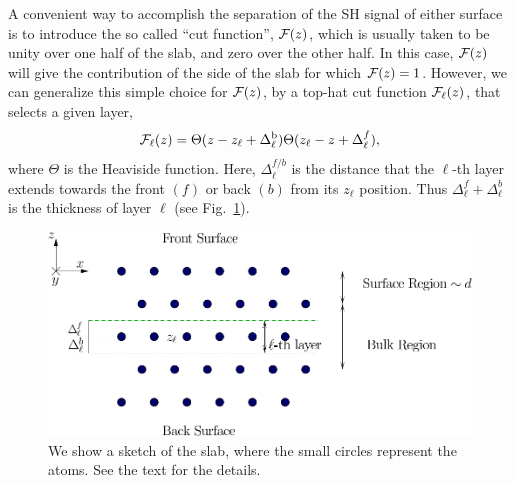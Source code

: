 \documentclass[floatfix,prb,aps,superscriptaddress,11pt,preprint]{revtex4}
\begin{document}
A convenient way to accomplish the separation of the SH signal of
either surface is to introduce
the so called
``cut function'', ${\mathbf{\cal F}}(z)$, which is usually taken to be unity over one half
of the slab, and zero over the other half.
In this case, ${\mathbf{\cal F}}(z)$ will give the contribution of the side of the
slab for which ${\mathbf{\cal F}}(z)=1$. However, we can generalize this simple choice
for ${\mathbf{\cal F}}(z)$, 
by a top-hat cut function
${\mathbf{\cal F}}_\ell(z)$, that selects a given layer,
\begin{equation}
\label{sz}
{\mathbf{\cal F}}_\ell(z)=\Theta(z-z_\ell+\Delta_\ell^{\mathrm{b}})
            \Theta(z_\ell-z+\Delta_\ell^f),
\end{equation}
where $\Theta$ is the Heaviside function. Here, $\Delta_\ell^{f/b}$
is the distance that the $\ell$-th layer extends towards the front
$(f)$ or back $(b)$ from its $z_\ell$ position.  Thus
$\Delta_\ell^f+\Delta_\ell^b$ is the thickness of layer $\ell$
(see Fig.~\ref{fslab}).
\begin{figure}[b]
\centering
\includegraphics[scale=.7]{slab}
\caption{
We show a sketch of the slab, where the small
circles represent the atoms. See the text for the details.
}
\label{fslab}
\end{figure}
\end{document}
